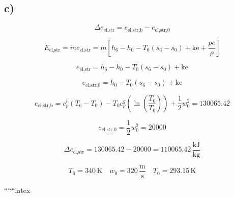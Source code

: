 

\subsection*{c)}

\[
\Delta e_{\text{el,str}} = e_{\text{el,str,b}} - e_{\text{el,str,0}}
\]

\[
\dot{E}_{\text{el,str}} = \dot{m} e_{\text{el,str}} = \dot{m} \left[ h_6 - h_0 - T_0 (s_6 - s_0) + \text{ke} + \frac{p e}{\rho} \right]
\]

\[
e_{\text{el,str}} = h_6 - h_0 - T_0 (s_6 - s_0) + \text{ke}
\]

\[
e_{\text{el,str,0}} = h_0 - T_0 (s_6 - s_0) + \text{ke}
\]

\[
e_{\text{el,str,b}} = c_p^i (T_6 - T_0) - T_0 c_p^g \left( \ln \left( \frac{T_6}{T_0} \right) \right) + \frac{1}{2} w_0^2 = 130065.42
\]

\[
e_{\text{el,str,0}} = \frac{1}{2} w_0^2 = 20000
\]

\[
\Delta e_{\text{el,str}} = 130065.42 - 20000 = 110065.42 \, \frac{\text{kJ}}{\text{kg}}
\]

\[
T_6 = 340 \, \text{K} \quad w_0 = 320 \, \frac{\text{m}}{\text{s}} \quad T_0 = 293.15 \, \text{K}
\]

``````latex
